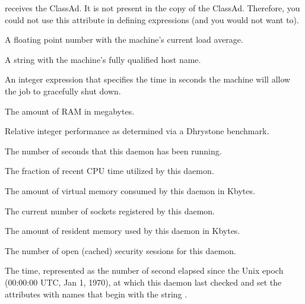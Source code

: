 \begin{description}
receives the ClassAd.
It is not present in the  copy of the ClassAd.
Therefore, you could not use this attribute in defining 
expressions (and you would not want to).
%
\item[\AdAttr{LoadAvg}:] A floating point number with the machine's current load
average.
%
\item[\AdAttr{Machine}:] A string with the machine's fully qualified host name.
%
\item[\AdAttr{MachineMaxVacateTime}:] An integer expression that specifies
the time in seconds the machine will allow the job to gracefully shut
down.
%
\item[\AdAttr{Memory}:] The amount of RAM in megabytes.
%
\item[\AdAttr{Mips}:] Relative integer performance as determined via a Dhrystone
benchmark.

\item[\AdAttr{MonitorSelfAge}:] The number of seconds that this daemon
  has been running.

\item[\AdAttr{MonitorSelfCPUUsage}:] The fraction of recent CPU time utilized
  by this daemon. 

\item[\AdAttr{MonitorSelfImageSize}:] The amount of virtual memory consumed by
  this daemon in Kbytes.

\item[\AdAttr{MonitorSelfRegisteredSocketCount}:] The current number of sockets
  registered by this daemon.

\item[\AdAttr{MonitorSelfResidentSetSize}:] The amount of resident memory
  used by this daemon in Kbytes.

\item[\AdAttr{MonitorSelfSecuritySessions}:] The number of open (cached)
  security sessions for this daemon.

\item[\AdAttr{MonitorSelfTime}:] The  time, represented as the number of
  second elapsed since the Unix epoch (00:00:00 UTC, Jan 1, 1970),
  at which this daemon last checked and set the attributes with names that
  begin with the string .
  

\end{description}
